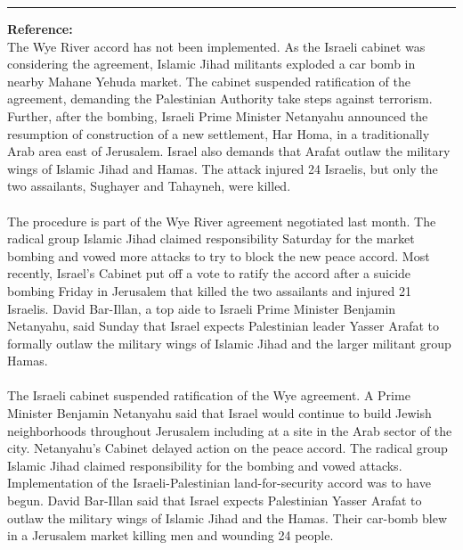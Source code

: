 \documentclass[11pt,a4paper]{article}
\begin{document}
\begin{figure*}[tb]
 \begin{flushleft}
  \begin{small}
  \hrule
{\bf Reference:}\\
The Wye River accord has not been implemented.
As the Israeli cabinet was considering the agreement, Islamic Jihad militants exploded a car bomb in nearby Mahane Yehuda market.
The cabinet suspended ratification of the agreement, demanding the Palestinian Authority take steps against terrorism.
Further, after the bombing, Israeli Prime Minister Netanyahu announced the resumption of construction of a new settlement, Har Homa, in a traditionally Arab area east of Jerusalem.
Israel also demands that Arafat outlaw the military wings of Islamic Jihad and Hamas.
The attack injured 24 Israelis, but only the two assailants, Sughayer and Tahayneh, were killed.\\
\vspace{2mm}
\\
The procedure is part of the Wye River agreement negotiated last month.
The radical group Islamic Jihad claimed responsibility Saturday for the market bombing and vowed more attacks to try to block the new peace accord.
Most recently, Israel's Cabinet put off a vote to ratify the accord after a suicide bombing Friday in Jerusalem that killed the two assailants and injured 21 Israelis.
David Bar-Illan, a top aide to Israeli Prime Minister Benjamin Netanyahu, said Sunday that Israel expects Palestinian leader Yasser Arafat to formally outlaw the military wings of Islamic Jihad and the larger militant group Hamas.\\
  \vspace{2mm}
  \\
The Israeli cabinet suspended ratification of the Wye agreement.
A Prime Minister Benjamin Netanyahu said that Israel would continue to build Jewish neighborhoods throughout Jerusalem including at a site in the Arab sector of the city.
Netanyahu's Cabinet delayed action on the peace accord.
The radical group Islamic Jihad claimed responsibility for the bombing and vowed attacks.
Implementation of the Israeli-Palestinian land-for-security accord was to have begun.
David Bar-Illan said that Israel expects Palestinian Yasser Arafat to outlaw the military wings of Islamic Jihad and the Hamas.
Their car-bomb blew in a Jerusalem market killing men and wounding 24 people.\\

\end{small}
\end{flushleft}
\end{figure*}
\end{document}
